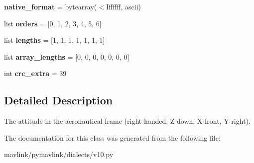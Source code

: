 \begin{DoxyCompactItemize}
\item 
\mbox{\label{classpymavlink_1_1dialects_1_1v10_1_1MAVLink__attitude__message_a6fb18fafb3f0eca539be5ad6051c0f86}} 
{\bfseries native\+\_\+format} = bytearray(\textquotesingle{}$<$Iffffff\textquotesingle{}, \textquotesingle{}ascii\textquotesingle{})
\item 
\mbox{\label{classpymavlink_1_1dialects_1_1v10_1_1MAVLink__attitude__message_a3bdef85e603ac94456acf2eff05904eb}} 
list {\bfseries orders} = \mbox{[}0, 1, 2, 3, 4, 5, 6\mbox{]}
\item 
\mbox{\label{classpymavlink_1_1dialects_1_1v10_1_1MAVLink__attitude__message_af9d1a63b2caa939ea1e7668f8ecccd04}} 
list {\bfseries lengths} = \mbox{[}1, 1, 1, 1, 1, 1, 1\mbox{]}
\item 
\mbox{\label{classpymavlink_1_1dialects_1_1v10_1_1MAVLink__attitude__message_af9268635797c756ec26c46ee9a012012}} 
list {\bfseries array\+\_\+lengths} = \mbox{[}0, 0, 0, 0, 0, 0, 0\mbox{]}
\item 
\mbox{\label{classpymavlink_1_1dialects_1_1v10_1_1MAVLink__attitude__message_a3f333ae07275db1dadc927825642711f}} 
int {\bfseries crc\+\_\+extra} = 39
\end{DoxyCompactItemize}


\subsection{Detailed Description}
\begin{DoxyVerb}The attitude in the aeronautical frame (right-handed, Z-down,
X-front, Y-right).
\end{DoxyVerb}
 

The documentation for this class was generated from the following file\+:\begin{DoxyCompactItemize}
\item 
mavlink/pymavlink/dialects/v10.\+py\end{DoxyCompactItemize}
